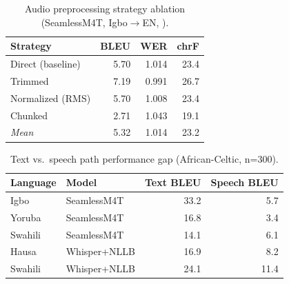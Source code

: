 
\begin{table}[t]
\centering
\small
\caption{Audio preprocessing strategy ablation (SeamlessM4T, Igbo$\to$EN, \dataAC{}).}
\label{tab:audio_ablation}
\begin{tabular}{lrrr}
\toprule
\textbf{Strategy} & \textbf{BLEU} & \textbf{WER} & \textbf{chrF} \\
\midrule
Direct (baseline)  & 5.70 & 1.014 & 23.4 \\
Trimmed            & 7.19 & 0.991 & 26.7 \\
Normalized (RMS)   & 5.70 & 1.008 & 23.4 \\
Chunked            & 2.71 & 1.043 & 19.1 \\
\midrule
\textit{Mean}      & 5.32 & 1.014 & 23.2 \\
\bottomrule
\end{tabular}
\end{table}

\begin{table}[t]
\centering
\small
\caption{Text vs.\ speech path performance gap (African-Celtic, n=300).}
\label{tab:text_vs_speech}
\begin{tabular}{llrr}
\toprule
\textbf{Language} & \textbf{Model} & \textbf{Text BLEU} & \textbf{Speech BLEU} \\
\midrule
Igbo    & SeamlessM4T  & 33.2 &  5.7 \\
Yoruba  & SeamlessM4T  & 16.8 &  3.4 \\
Swahili & SeamlessM4T  & 14.1 &  6.1 \\
Hausa   & Whisper+NLLB & 16.9 &  8.2 \\
Swahili & Whisper+NLLB & 24.1 & 11.4 \\
\bottomrule
\end{tabular}
\end{table}
